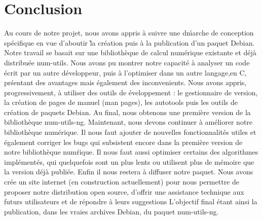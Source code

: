 \chapter*{Conclusion}

Au cours de notre projet, nous avons appris \`a suivre une d\'marche de conception sp\'ecifique en vue d'aboutir \` la cr\'eation
puis \`a la publication d'un paquet Debian. Notre travail se basait sur une biblioth\`eque de calcul num\'erique existante et d\'ej\`a
distribu\'ee num-utils. Nous avons pu montrer notre capacit\'e \`a analyser un code \'ecrit par un autre d\'eveloppeur, puis \`a l'optimiser dans 
un autre langage,en C, pr\'sentant des avantages mais \'egalement des inconvenients. Nous avons appris, progressivement, \`a utiliser des outils
de \'eveloppement : le gestionnaire de version, la cr\'eation de pages de manuel (man pages), les autotools puis les outils de cr\'eation de paquets Debian. Au final, nous obtenons une premi\`ere
version de la biblioth\`eque num-utils-ng.
\newline
\newline
Maintenant, nous devons continuer \`a am\'eliorer notre biblioth\`eque num\'erique. Il nous faut ajouter de nouvelles fonctionnalit\'es utiles et \'egalement 
corriger les bugs qui subsistent encore dans la premi\`ere version de notre biblioth\`eque num\'rique. Il nous faut aussi optimiser certains des 
algorithmes impl\'ement\'es, qui quelquefois sont un plus lents ou utilisent plus de m\'emoire que la version d\'ej\`a publi\'ee. Enfin il nous restera \`a
diffuser notre paquet. Nous avons cr\'ee un site internet (en construction actuellement) pour nous permettre de proposer notre distribution open source,
d'offrir une assistance technique aux futurs utilisateurs et de r\'epondre \`a leurs suggestions
\newline
\newline
L'objectif final \'etant ainsi la publication, dans les vraies archives Debian, du paquet num-utils-ng.
